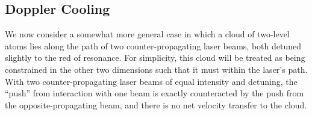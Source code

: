 
\subsection{Doppler Cooling}
\label{sec:dopplercooling}
We now consider a somewhat more general case in which a cloud of two-level atoms lies along the path of two counter-propagating laser beams, both detuned slightly to the red of resonance.  For simplicity, this cloud will be treated as being constrained in the other two dimensions such that it must within the laser's path.  With two counter-propagating laser beams of equal intensity and detuning, the ``push'' from interaction with one beam is exactly counteracted by the push from the opposite-propagating beam, and there is no net velocity transfer to the cloud.  

